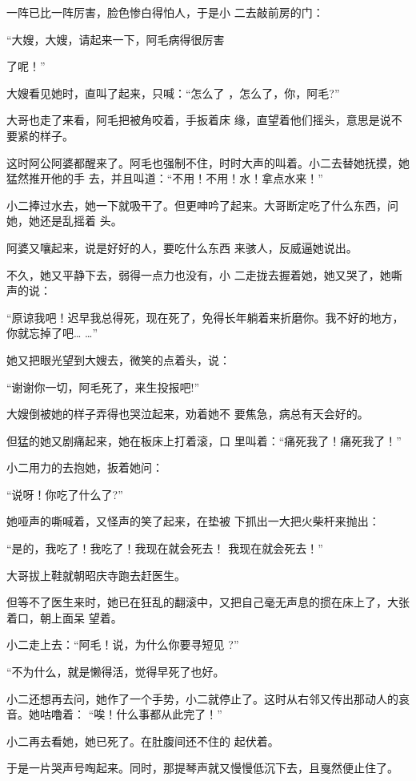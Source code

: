\documentclass{article}
\begin{document}
一阵已比一阵厉害，脸色惨白得怕人，于是小
二去敲前房的门： 

“大嫂，大嫂，请起来一下，阿毛病得很厉害

\newpage
了呢！” 

大嫂看见她时，直叫了起来，只喊：“怎么了
，怎么了，你，阿毛?” 

大哥也走了来看，阿毛把被角咬着，手扳着床
缘，直望着他们摇头，意思是说不要紧的样子。 

这时阿公阿婆都醒来了。阿毛也强制不住，时时大声的叫着。小二去替她抚摸，她猛然推开他的手
去，并且叫道：“不用！不用！水！拿点水来！” 

小二捧过水去，她一下就吸干了。但更呻吟了起来。大哥断定吃了什么东西，问她，她还是乱摇着
头。 

阿婆又嚷起来，说是好好的人，要吃什么东西
来骇人，反威逼她说出。 

不久，她又平静下去，弱得一点力也没有，小
二走拢去握着她，她又哭了，她嘶声的说： 

\newpage

“原谅我吧！迟早我总得死，现在死了，免得长年躺着来折磨你。我不好的地方，你就忘掉了吧…
…” 

她又把眼光望到大嫂去，微笑的点着头，说：


“谢谢你一切，阿毛死了，来生投报吧!” 

大嫂倒被她的样子弄得也哭泣起来，劝着她不
要焦急，病总有天会好的。 

但猛的她又剧痛起来，她在板床上打着滚，口
里叫着：“痛死我了！痛死我了！” 


小二用力的去抱她，扳着她问： 


“说呀！你吃了什么了?” 

她哑声的嘶喊着，又怪声的笑了起来，在垫被
下抓出一大把火柴杆来抛出： 

\newpage

“是的，我吃了！我吃了！我现在就会死去！
我现在就会死去！” 


大哥拔上鞋就朝昭庆寺跑去赶医生。 

但等不了医生来时，她已在狂乱的翻滚中，又把自己毫无声息的掼在床上了，大张着口，朝上面呆
望着。 

小二走上去：“阿毛！说，为什么你要寻短见
?” 

“不为什么，就是懒得活，觉得早死了也好。

小二还想再去问，她作了一个手势，小二就停止了。这时从右邻又传出那动人的哀音。她咕噜着：
“唉！什么事都从此完了！” 

小二再去看她，她已死了。在肚腹间还不住的
起伏着。 

\newpage

于是一片哭声号啕起来。同时，那提琴声就又慢慢低沉下去，且戛然便止住了。
\end{document}
